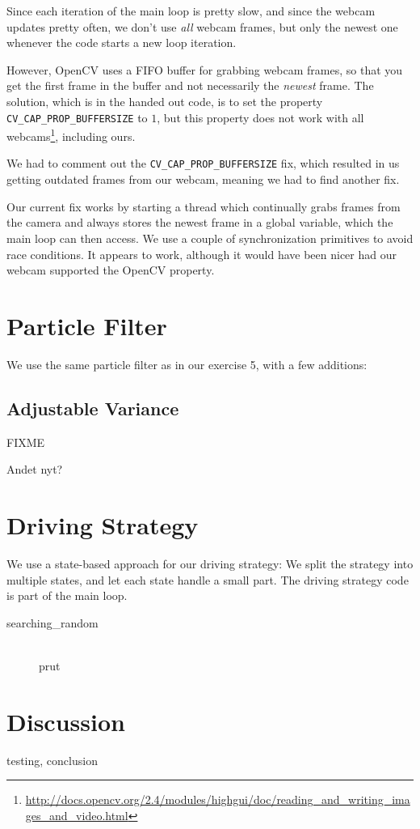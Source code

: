 \documentclass[a4paper,12pt]{article}
\begin{document}
Since each iteration of the main loop is pretty slow, and since the webcam
updates pretty often, we don't use \emph{all} webcam frames, but only the newest
one whenever the code starts a new loop iteration.

However, OpenCV uses a FIFO buffer for grabbing webcam frames, so that you get
the first frame in the buffer and not necessarily the \emph{newest} frame.  The
solution, which is in the handed out code, is to set the property
\texttt{CV_CAP_PROP_BUFFERSIZE} to $1$, but this property does not work with all
webcams\footnote{\url{http://docs.opencv.org/2.4/modules/highgui/doc/reading_and_writing_images_and_video.html}},
including ours.

We had to comment out the \texttt{CV_CAP_PROP_BUFFERSIZE} fix, which resulted in
us getting outdated frames from our webcam, meaning we had to find another fix.

Our current fix works by starting a thread which continually grabs frames from
the camera and always stores the newest frame in a global variable, which the
main loop can then access.  We use a couple of synchronization primitives to
avoid race conditions.  It appears to work, although it would have been nicer
had our webcam supported the OpenCV property.


\section{Particle Filter}

We use the same particle filter as in our exercise 5, with a few additions:

\subsection{Adjustable Variance}

FIXME

Andet nyt?


\section{Driving Strategy}

We use a state-based approach for our driving strategy: We split the strategy
into multiple states, and let each state handle a small part.  The driving
strategy code is part of the main loop.

\begin{description}
\item[searching_random]\hfill\\
prut\end{description}



\section{Discussion}

testing, conclusion
\end{document}
